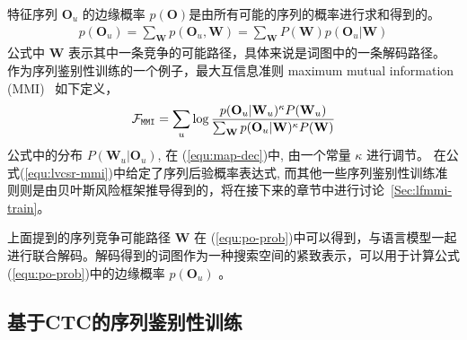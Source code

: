 特征序列 $\mathbf{O}_u$ 的边缘概率 $p(\mathbf{O})$是由所有可能的序列的概率进行求和得到的。
\begin{equation}
\label{equ:po-prob}
\begin{split}
p(\mathbf{O}_u)=\sum_\mathbf{W} p(\mathbf{O}_u,\mathbf{W})= \sum_\mathbf{W} P(\mathbf{W}) p(\mathbf{O}_u|\mathbf{W})
\end{split}
\end{equation}
公式中 $\mathbf{W}$ 表示其中一条竞争的可能路径，具体来说是词图中的一条解码路径。
作为序列鉴别性训练的一个例子，最大互信息准则 maximum mutual information (MMI)~\cite{bahl1986maximum} 如下定义，
\begin{equation}
\label{equ:lvcsr-mmi}
\begin{split}
\mathcal{F}_{\tt{MMI}}%
=\sum_{u} \log \frac {p(\mathbf{O}_u|\mathbf{W}_u)^{\kappa}P(\mathbf{W}_u)}{\sum_{\mathbf{W}} p(\mathbf{O}_u|\mathbf{W})^{\kappa}P(\mathbf{W})}  
\end{split}
\end{equation}
公式中的分布 $P(\mathbf{W}_u|\mathbf{O}_u)$, 在 (\ref{equ:map-dec})中, 由一个常量 $\kappa$ 进行调节。 %
在公式(\ref{equ:lvcsr-mmi})中给定了序列后验概率表达式, 而其他一些序列鉴别性训练准则则是由贝叶斯风险框架推导得到的，将在接下来的章节中进行讨论~\ref{Sec:lfmmi-train}。


上面提到的序列竞争可能路径 $\mathbf{W}$ 在 (\ref{equ:po-prob})中可以得到，与语言模型一起进行联合解码。解码得到的词图作为一种搜索空间的紧致表示，可以用于计算公式(\ref{equ:po-prob})中的边缘概率 $p(\mathbf{O}_u)$ 。

  

\subsection{基于CTC的序列鉴别性训练}
\label{Sec:sdm-sdt-intro}

